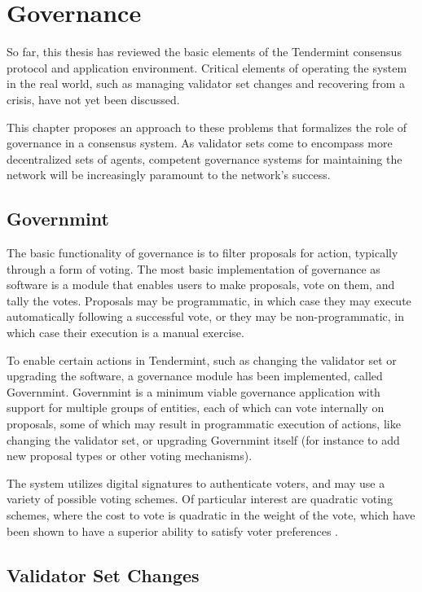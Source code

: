 \chapter{Governance}
\label{ch:governance}

So far, this thesis has reviewed the basic elements of the Tendermint consensus protocol and application environment.
Critical elements of operating the system in the real world, such as managing validator set changes
and recovering from a crisis, have not yet been discussed. 

This chapter proposes an approach to these problems that formalizes the role of governance in a consensus system.
As validator sets come to encompass more decentralized sets of agents, competent governance systems 
for maintaining the network will be increasingly paramount to the network's success.

\section{Governmint}

The basic functionality of governance is to filter proposals for action, typically through a form of voting.
The most basic implementation of governance as software is a module that enables users to make proposals,
vote on them, and tally the votes. 
Proposals may be programmatic, in which case they may execute automatically following a successful vote,
or they may be non-programmatic, in which case their execution is a manual exercise.

To enable certain actions in Tendermint, such as changing the validator set or upgrading the software,
a governance module has been implemented, called Governmint.
Governmint is a minimum viable governance application with support for multiple groups of entities,
each of which can vote internally on proposals, some of which may result in programmatic execution of actions,
like changing the validator set, or upgrading Governmint itself (for instance to add new proposal types or other voting mechanisms).

The system utilizes digital signatures to authenticate voters, 
and may use a variety of possible voting schemes.
Of particular interest are quadratic voting schemes,
where the cost to vote is quadratic in the weight of the vote,
which have been shown to have a superior ability to satisfy voter preferences \cite{posner2013quadratic}.

\section{Validator Set Changes}

